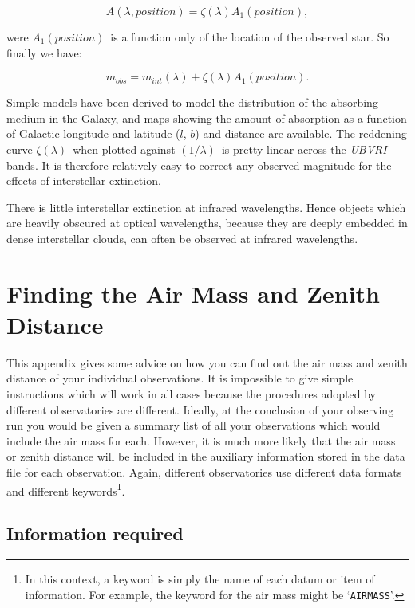 \documentclass[twoside,11pt,nolof]{starlink}
\begin{document}
\begin{equation}
A(\lambda,position) = \zeta (\lambda) A_1(position)  ,
\end{equation}

were $A_1(position)$\, is a function only of the location of the
observed star.  So finally we have:

\begin{equation}
m_{obs} = m_{int}(\lambda) + \zeta (\lambda)A_1(position).
\end{equation}

Simple models\cite{JASCHEK87} have been derived to model the
distribution of the absorbing medium in the Galaxy, and
maps\cite{NECKEL66, NECKEL80} showing the amount of absorption as a
function of Galactic longitude and latitude ($l$, $b$) and distance
are available.  The reddening curve $\zeta(\lambda)$\, when plotted
against $(1/\lambda)$\, is pretty linear across the \textit{UBVRI}\,
bands\cite{SCHILD77}. It is therefore relatively easy to correct any
observed magnitude for the effects of interstellar extinction.

There is little interstellar extinction at infrared wavelengths.  Hence
objects which are heavily obscured at optical wavelengths, because they
are deeply embedded in dense interstellar clouds, can often be observed
at infrared wavelengths.


\newpage
\section{\label{FINDAIRM}Finding the Air Mass and
Zenith Distance}

This appendix gives some advice on how you can find out the air mass
and zenith distance of your individual observations.  It is impossible
to give simple instructions which will work in all cases because the
procedures adopted by different observatories are different.  Ideally,
at the conclusion of your observing run you would be given a summary
list of all your observations which would include the air mass for
each.  However, it is much more likely that the air mass or zenith
distance will be included in the auxiliary information stored in the
data file for each observation.  Again, different observatories use
different data formats and different keywords\footnote{In this context,
a keyword is simply the name of each datum or item of information.  For
example, the keyword for the air mass might be `\texttt{AIRMASS}'.}.

\subsection{Information required}
\end{document}

